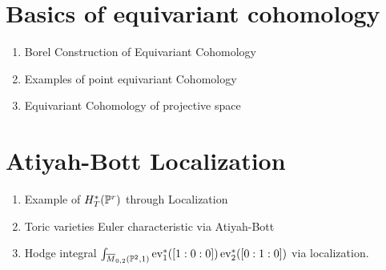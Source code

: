 \documentclass[12pt]{memoir}
\begin{document}
\section{Basics of equivariant cohomology}
\begin{enumerate}
    \item Borel Construction of Equivariant Cohomology
    \item Examples of point equivariant Cohomology
    \item Equivariant Cohomology of projective space
\end{enumerate}

\section{Atiyah-Bott Localization}

\begin{enumerate}
    \item Example of $H^\ast_T(\mathbb{P}^r)$ through Localization
    \item Toric varieties Euler characteristic via Atiyah-Bott
    \item Hodge integral $\int_{\overline M_{0,2}(\mathbb{P}^2,1)}\operatorname{ev}_1^\ast([1:0:0])\operatorname{ev}_2^\ast([0:1:0])$ via localization.
\end{enumerate}

\ifx\nextra\undefined
\printindex
\else\fi
\nocite{*}


\end{document}
